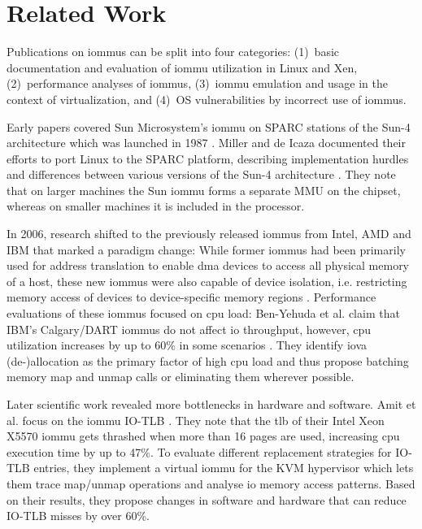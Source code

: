\chapter{Related Work}
\label{chap:related_work}

Publications on \acp{iommu} can be split into four categories:
(1)~basic documentation and evaluation of \ac{iommu} utilization in Linux and
   Xen,
(2)~performance analyses of \acp{iommu},
(3)~\ac{iommu} emulation and usage in the context of virtualization, and
(4)~OS vulnerabilities by incorrect use of \acp{iommu}.

Early papers covered Sun Microsystem's \ac{iommu} on SPARC stations of the Sun-4
architecture which was launched in 1987 \cite{miller1996linux,
kunisawa1997gigabit}.  Miller and de Icaza documented their efforts to port
Linux to the SPARC platform, describing implementation hurdles and differences
between various versions of the Sun-4 architecture \cite{miller1996linux}. They
note that on larger machines the Sun \ac{iommu} forms a separate MMU on the
chipset, whereas on smaller machines it is included in the processor.

In 2006, research shifted to the previously released \acp{iommu} from Intel, AMD
and IBM that marked a paradigm change: While former \acp{iommu} had been
primarily used for address translation to enable \ac{dma} devices to access all
physical memory of a host, these new \acp{iommu} were also capable of device
isolation, i.e. restricting memory access of devices to device-specific memory
regions \cite{ben2006utilizing}. Performance evaluations of these \acp{iommu}
focused on \ac{cpu} load: Ben-Yehuda et al. claim that IBM's Calgary/DART
\acp{iommu} do not affect \ac{io} throughput, however, \ac{cpu} utilization
increases by up to 60\% in some scenarios \cite{ben2007price}. They identify
\ac{iova} (de-)allocation as the primary factor of high \ac{cpu} load and thus
propose batching memory map and unmap calls or eliminating them wherever
possible.

Later scientific work revealed more bottlenecks in hardware and software. Amit
et al. focus on the \ac{iommu} IO-TLB \cite{amit2010iommu}. They note that the
\ac{tlb} of their Intel Xeon X5570 \ac{iommu} gets thrashed when more than 16
pages are used, increasing \ac{cpu} execution time by up to 47\%. To evaluate
different replacement strategies for IO-TLB entries, they implement a virtual
\ac{iommu} for the KVM hypervisor which lets them trace map/unmap operations and
analyse \ac{io} memory access patterns. Based on their results, they propose
changes in software and hardware that can reduce IO-TLB misses by over 60\%.

